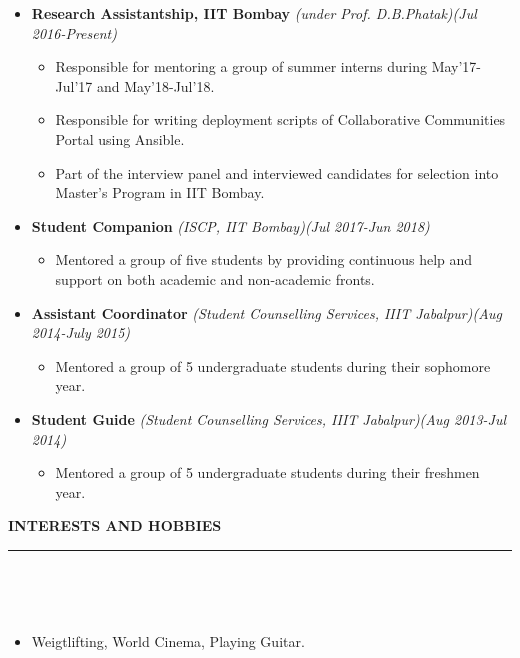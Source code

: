 \documentclass[a4paper,10pt]{article}
\newcommand{\lsep}{-0.5cm}
\newcommand{\resheading}[1]{{\small
        {
            \begin{minipage}
                {0.975\textwidth}\textbf{{\textsc{#1 \vphantom{p\^{E}} }}}
                \\[-0.3cm]
                \hrule
            \end{minipage}
            \\[-0.5cm]
        }
 }}
\begin{document}
\begin{itemize}
    \item \textbf{Research Assistantship, IIT Bombay }\emph{(under Prof. D.B.Phatak)}\hfill {\emph{(Jul 2016-Present)}} \\[-0.6cm]
        \begin{itemize}
                \item Responsible for mentoring a group of summer interns during May'17-Jul'17 and May'18-Jul'18.
                \item Responsible for writing deployment scripts of Collaborative Communities Portal using Ansible.
                \item Part of the interview panel and interviewed candidates for selection into Master's Program in IIT Bombay.
        \end{itemize}
    \item \textbf{Student Companion }\emph{(ISCP, IIT Bombay)}\hfill {\emph{(Jul 2017-Jun 2018)}} \\[-0.6cm]
        \begin{itemize}
                \item Mentored a group of five students by providing continuous help and support on both academic and non-academic fronts.
        \end{itemize}
    \item \textbf{Assistant Coordinator }\emph{(Student Counselling Services, IIIT Jabalpur)}\hfill {\emph{(Aug 2014-July 2015)}} \\[-0.6cm]
        \begin{itemize}
                \item Mentored a group of 5 undergraduate students during their sophomore year.
        \end{itemize}
    \item \textbf{Student Guide }\emph{(Student Counselling Services, IIIT Jabalpur)}\hfill {\emph{(Aug 2013-Jul 2014)}} \\[-0.6cm]
        \begin{itemize}
                \item Mentored a group of 5 undergraduate students during their freshmen year.
        \end{itemize}
\end{itemize}





\vspace{0.1cm}
\resheading{\textbf{ \large INTERESTS AND HOBBIES} }\\[\lsep]
\begin{itemize}
\item \noindent Weigtlifting, World Cinema, Playing Guitar.
\end{itemize}
\end{document}
